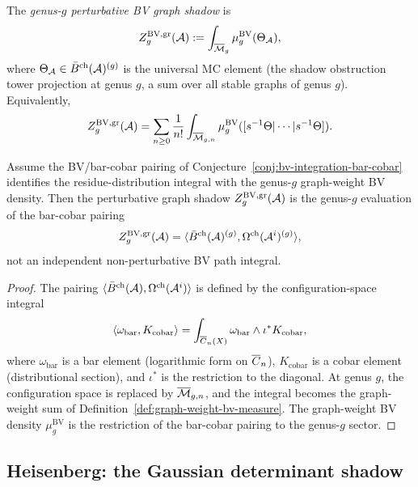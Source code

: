 \begin{definition}
The \emph{genus-$g$ perturbative BV graph shadow} is
\begin{equation}
Z_g^{\mathrm{BV,gr}}(\mathcal{A})
 := \int_{\overline{\mathcal{M}}_g} \mu^{\mathrm{BV}}_g(\Theta_{\mathcal{A}}),
\end{equation}
where $\Theta_{\mathcal{A}} \in \bar{B}^{\mathrm{ch}}(\mathcal{A})^{(g)}$ is the universal MC element
(the shadow obstruction tower projection at genus $g$, a sum over all stable graphs
of genus $g$). Equivalently,
\[
Z_g^{\mathrm{BV,gr}}(\mathcal{A})
 = \sum_{n \geq 0} \frac{1}{n!}
 \int_{\overline{\mathcal{M}}_{g,n}}
 \mu^{\mathrm{BV}}_g([s^{-1}\Theta | \cdots | s^{-1}\Theta]).
\]
\end{definition}

\begin{proposition}
Assume the BV/bar-cobar pairing of
Conjecture~\ref{conj:bv-integration-bar-cobar} identifies the
residue-distribution integral with the genus-$g$ graph-weight BV
density. Then the perturbative graph shadow
$Z_g^{\mathrm{BV,gr}}(\mathcal{A})$ is the genus-$g$ evaluation of the
bar-cobar pairing
\[
Z_g^{\mathrm{BV,gr}}(\mathcal{A})
 = \langle \bar{B}^{\mathrm{ch}}(\mathcal{A})^{(g)},
 \Omega^{\mathrm{ch}}(\mathcal{A}^i)^{(g)} \rangle,
\]
not an independent non-perturbative BV path integral.
\end{proposition}

\begin{proof}
The pairing $\langle \bar{B}^{\mathrm{ch}}(\mathcal{A}), \Omega^{\mathrm{ch}}(\mathcal{A}^i) \rangle$ is defined
by the configuration-space integral
\[
\langle \omega_{\mathrm{bar}}, K_{\mathrm{cobar}} \rangle
 = \int_{\overline{C}_n(X)} \omega_{\mathrm{bar}} \wedge \iota^* K_{\mathrm{cobar}},
\]
where $\omega_{\mathrm{bar}}$ is a bar element (logarithmic form on
$\overline{C}_n$), $K_{\mathrm{cobar}}$ is a cobar element (distributional
section), and $\iota^*$ is the restriction to the diagonal. At genus
$g$, the configuration space is replaced by $\overline{\mathcal{M}}_{g,n}$, and the
integral becomes the graph-weight sum of
Definition~\ref{def:graph-weight-bv-measure}. The graph-weight BV density
$\mu^{\mathrm{BV}}_g$ is the restriction of the bar-cobar pairing to
the genus-$g$ sector.
\end{proof}

\subsection{Heisenberg: the Gaussian determinant shadow}

